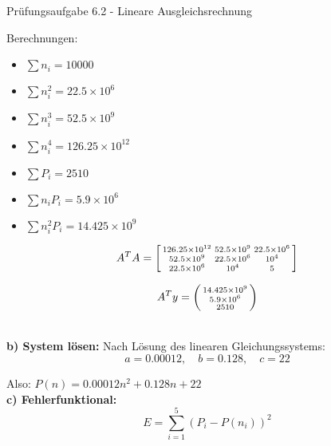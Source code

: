 \begin{example2}{Prüfungsaufgabe 6.2 - Lineare Ausgleichsrechnung}
\begin{minipage}{0.38\linewidth}
Berechnungen:
\begin{itemize}
    \item $\sum n_i = 10000$
    \item $\sum n_i^2 = 22.5 \times 10^6$
    \item $\sum n_i^3 = 52.5 \times 10^9$
    \item $\sum n_i^4 = 126.25 \times 10^{12}$
    \item $\sum P_i = 2510$
    \item $\sum n_i P_i = 5.9 \times 10^6$
    \item $\sum n_i^2 P_i = 14.425 \times 10^9$
\end{itemize}
\end{minipage}
\begin{minipage}{0.7\linewidth}
$$A^T A = \begin{bsmallmatrix}
126.25 \times 10^{12} & 52.5 \times 10^9 & 22.5 \times 10^6 \\
52.5 \times 10^9 & 22.5 \times 10^6 & 10^4 \\
22.5 \times 10^6 & 10^4 & 5
\end{bsmallmatrix}$$

$$A^T y = \begin{psmallmatrix} 14.425 \times 10^9 \\ 5.9 \times 10^6 \\ 2510 \end{psmallmatrix}$$
\end{minipage}
\vspace{2mm}\\
\textbf{b) System lösen:}
Nach Lösung des linearen Gleichungssystems:
$$a = 0.00012, \quad b = 0.128, \quad c = 22$$

Also: $P(n) = 0.00012n^2 + 0.128n + 22$
\vspace{2mm}\\
\textbf{c) Fehlerfunktional:}
$$E = \sum_{i=1}^{5} (P_i - P(n_i))^2$$



\end{example2}

